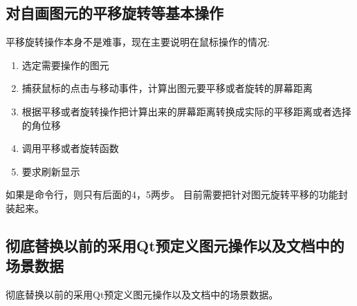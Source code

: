 \subsection{对自画图元的平移旋转等基本操作} \label{SectArchTaskDrawAltr} 
平移旋转操作本身不是难事，现在主要说明在鼠标操作的情况:
\begin{enumerate}
	\item 选定需要操作的图元
	\item 捕获鼠标的点击与移动事件，计算出图元要平移或者旋转的屏幕距离
	\item 根据平移或者旋转操作把计算出来的屏幕距离转换成实际的平移距离或者选择的角位移
	\item 调用平移或者旋转函数
	\item 要求刷新显示
\end{enumerate}
如果是命令行，则只有后面的4，5两步。
目前需要把针对图元旋转平移的功能封装起来。

\subsection{彻底替换以前的采用Qt预定义图元操作以及文档中的场景数据} \label{SectArchTaskReplaceQt} 
彻底替换以前的采用Qt预定义图元操作以及文档中的场景数据。


